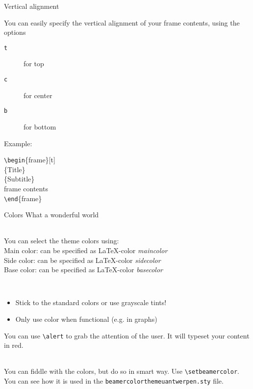 \documentclass[aspectratio=1610]{beamer}
\newcommand*\command[1]{{\tt \textbackslash #1}}
\newcommand*\ind[1][2ex]{\hspace*{#1}}
\newcommand*\bframe[1][]{\command{begin}\{#1frame\}}
\newcommand*\eframe[1][]{\command{end}\{#1frame\}}
\begin{document}
\begin{frame}[t]
  {Vertical alignment}

  You can easily specify the vertical alignment of your frame
  contents, using the options
  \begin{description}
  \item[\texttt{t}] for top
  \item[\texttt{c}] for center
  \item[\texttt{b}] for bottom
  \end{description}

  Example:\\[1ex]
  \begin{codesnippet}
    \bframe[][t]\\
    \ind\{Title\}\\
    \ind\{Subtitle\}\\
    \ind frame contents\\
    \eframe
  \end{codesnippet}

\end{frame}

\begin{frame}[t]
  {Colors}
  {What a wonderful world}

  \\
  You can select the theme colors using:\\
  \textcolor{maincolor}{Main color}:
  can be specified as \LaTeX-color \emph{maincolor}\\
  \textcolor{sidecolor}{Side color}:
  can be specified as \LaTeX-color \emph{sidecolor}\\
  \textcolor{basecolor}{Base color}:
  can be specified as \LaTeX-color
  \emph{basecolor}

  \\
  \begin{itemize}
  \item Stick to the standard colors or use grayscale tints!
  \item Only use color when functional (e.g. in graphs)
  \end{itemize}

  You can use \alert{\command{alert{}}} to grab the attention of the
  user. It will typeset your content in \alert{red}.

  \\
  You can fiddle with the colors, but do so in smart way.
  Use \command{setbeamercolor}. You can see how it is used in the
  \texttt{beamercolorthemeuantwerpen.sty} file.
\end{frame}
\end{document}
